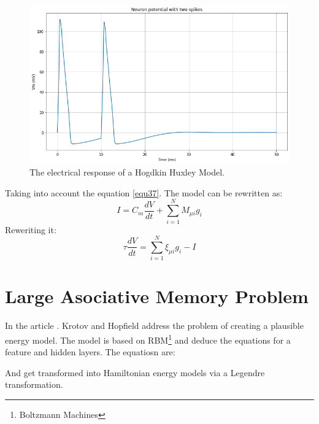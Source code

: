 \documentclass[journal]{IEEEtai}
\begin{document}
\begin{figure}
\centering
\includegraphics[width=\linewidth]{spikes.png}
\caption{The electrical response of a Hogdkin Huxley Model.}
 \label{fig:HH2}
\end{figure}

Taking into account the equation \eqref{equ37}. The model can be rewritten as:
\begin{equation}\label{equ41}
I=C_{m}\frac{dV}{dt}+ \sum^{N}_{i=1}M_{\mu i} g_{i}
\end{equation}
Reweriting it:
\begin{equation}\label{equ41}
\tau \frac{dV}{dt}= \sum^{N}_{i=1}\xi_{\mu i} g_{i}-I
\end{equation}

\section{Large Asociative Memory Problem}
In the article \cite{Krotov}. Krotov and Hopfield address the problem of creating a plausible energy model. The model is based on RBM\footnote{Boltzmann Machines} and deduce the equations for a feature and hidden layers. The equatiosn are:

And get transformed into Hamiltonian energy models via a Legendre transformation.
  
\end{document}
